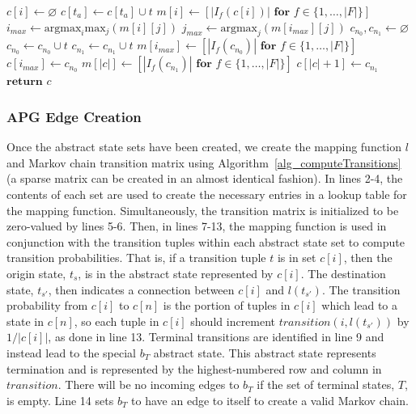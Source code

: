 \documentclass[letterpaper]{article} %
\begin{document}
\begin{algorithm}[t]
\caption{Compute abstract states based on transition samples and learned policy.} \label{alg_makePolicyGraph}
\begin{algorithmic}[1]
\State $c[i] \leftarrow \varnothing$ 
\EndFor
{} 
\State $c[t_a] \leftarrow c[t_a] \cup t$
\EndIf
\EndFor
{} 
\State $m[i] \leftarrow [ | I_f(c[i]) | \textbf{ for } f \in \{1, \ldots, |F|\}]$
\EndFor
{}
\State $i_{max} \leftarrow \text{argmax}_i \text{max}_j \left( m[i][j] \right)$
\State $j_{max} \leftarrow \text{argmax}_j \left( m[i_{max}][j] \right)$
\State $c_{n_0}, c_{n_1} \leftarrow \varnothing$
 
\State $c_{n_0} \leftarrow c_{n_0} \cup t$
\Else
\State $c_{n_1} \leftarrow c_{n_1} \cup t$
\EndIf
\EndFor
\State $m[i_{max}] \leftarrow [|I_f(c_{n_0})| \textbf{ for } f \in \{1, \ldots, |F|\}]$
\State $c[i_{max}] \leftarrow c_{n_0}$
\State $m[|c|] \leftarrow [|I_f(c_{n_1})| \textbf{ for } f \in \{1, \ldots, |F|\}]$
\State $c[|c| + 1] \leftarrow c_{n_1}$
\EndWhile
\State $\textbf{return } c$
\EndProcedure
\end{algorithmic}
\end{algorithm}

\subsubsection{APG Edge Creation}
Once the abstract state sets have been created, we create the mapping function $l$ and Markov chain transition matrix using Algorithm~\ref{alg_computeTransitions} (a sparse matrix can be created in an almost identical fashion). In lines 2-4, the contents of each set are used to create the necessary entries in a lookup table for the mapping function. Simultaneously, the transition matrix is initialized to be zero-valued by lines 5-6. Then, in lines 7-13, the mapping function is used in conjunction with the transition tuples within each abstract state set to compute transition probabilities. That is, if a transition  tuple $t$ is in set $c[i]$, then the origin state, $t_s$, is in the abstract state represented by $c[i]$. The destination state, $t_{s'}$, then indicates a connection between $c[i]$ and $l(t_{s'})$. The transition probability from $c[i]$ to $c[n]$ is the portion of tuples in $c[i]$ which lead to a state in $c[n]$, so each tuple in $c[i]$ should increment $transition(i, l(t_{s'}))$ by $1 / |c[i]|$, as done in line 13.
Terminal transitions are identified in line 9 and instead lead to the special $b_T$ abstract state. This abstract state represents termination and is represented by the highest-numbered row and column in $transition$. There will be no incoming edges to $b_T$ if the set of terminal states, $T$, is empty. Line 14 sets $b_T$ to have an edge to itself to create a valid Markov chain.
\end{document}
